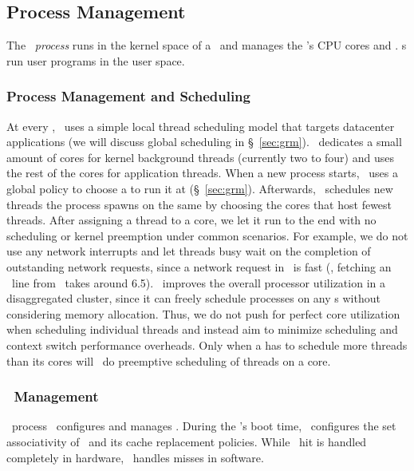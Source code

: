\documentclass[10pt,times,twocolumn]{z2-article}
\begin{document}
{{{{{{{\subsection{Process Management}
The \lego\ {\em process \microos{}} runs in the kernel space of a \pcomponent\
and manages the \pcomponent's CPU cores and \excache. 
\pcomponent{}s run user programs in the user space.

\subsubsection{Process Management and Scheduling}
\label{sec:proc-scheduling}
At every \pcomponent, \lego\ uses a simple local thread scheduling model 
that targets datacenter applications 
(we will discuss global scheduling in \S~\ref{sec:grm}).
\lego\ dedicates a small amount of cores for kernel background threads 
(currently two to four)
and uses the rest of the cores for application threads.
When a new process starts, \lego\ uses a global policy to choose a \pcomponent{} to run it at (\S~\ref{sec:grm}).
Afterwards, \lego\ schedules new threads the process spawns on the same \pcomponent{} 
by choosing the cores that host fewest threads.
After assigning a thread to a core, 
we let it run to the end with no scheduling or kernel preemption under common scenarios.
For example, we do not use any network interrupts 
and let threads busy wait on the completion of outstanding network requests, 
since a network request in \lego\ is fast 
(\eg, fetching an \excache\ line from \mcomponent\ takes around 6.5\mus).
\lego\ improves the overall processor utilization in a disaggregated cluster,
since it can freely schedule processes on any \pcomponent{}s without considering memory allocation.
Thus, we do not push for perfect core utilization when scheduling individual threads
and instead aim to minimize scheduling and context switch performance overheads.
Only when a \pcomponent{} has to schedule %
more threads than its cores will
\lego\ do preemptive scheduling of threads on a core.

\subsubsection{\excache\ Management}
\label{sec:excachemgmt}
\lego\ process \microos\ configures and manages \excache.
During the \pcomponent{}'s boot time, \lego\ configures the set associativity of \excache\
and its cache replacement policies.
While \excache\ hit is handled completely in hardware, 
\lego\ handles misses in software.

}}}}}}}
\end{document}
